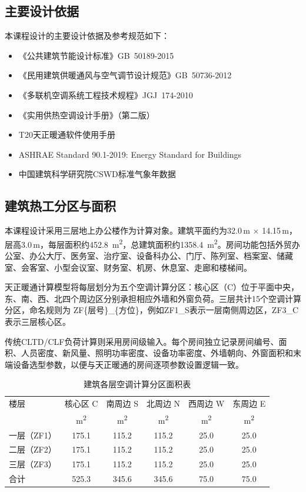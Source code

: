 \subsection{主要设计依据}

本课程设计的主要设计依据及参考规范如下：
\begin{itemize}
    \item \cite{gb50189}《公共建筑节能设计标准》GB~50189-2015
    \item \cite{gb50736}《民用建筑供暖通风与空气调节设计规范》GB~50736-2012
    \item \cite{jgj174}《多联机空调系统工程技术规程》JGJ~174-2010
    \item \cite{luyq2008_hvac_handbook}《实用供热空调设计手册》（第二版）
    \item \cite{tangent_t20_hvac_manual}T20天正暖通软件使用手册
    \item \cite{ashrae9012019}ASHRAE Standard 90.1-2019: Energy Standard for Buildings
    \item \cite{onebuilding}中国建筑科学研究院CSWD标准气象年数据
\end{itemize}


\subsection{建筑热工分区与面积}

本课程设计采用三层地上办公楼作为计算对象。建筑平面约为32.0\,m $\times$ 14.15\,m，层高3.0\,m，每层面积约\SI{452.8}{\meter^2}，总建筑面积约\SI{1358.4}{\meter^2}。房间功能包括外贸办公室、办公大厅、医务室、治疗室、设备科办公、门厅、陈列室、档案室、储藏室、会客室、小型会议室、财务室、机房、休息室、走廊和楼梯间。

天正暖通计算模型将每层划分为五个空调计算分区：核心区（C）位于平面中央，东、南、西、北四个周边区分别承担相应外墙和外窗负荷。三层共计15个空调计算分区，命名规则为 ZF\{层号\}\_\{方位\}，例如ZF1\_S表示一层南侧周边区，ZF3\_C表示三层核心区。

传统CLTD/CLF负荷计算则采用房间级输入。每个房间独立记录房间编号、面积、人员密度、新风量、照明功率密度、设备功率密度、外墙朝向、外窗面积和末端设备选型参数，以便与天正暖通的房间逐项参数设置逻辑一致。

\begin{table}[!htbp]
\centering
\caption{建筑各层空调计算分区面积表}
\label{tab:zone-areas}
\begin{tabular}{@{}lccccc@{}}
\toprule
楼层 & 核心区 C & 南周边 S & 北周边 N & 西周边 W & 东周边 E \\
 & \si{m^2} & \si{m^2} & \si{m^2} & \si{m^2} & \si{m^2} \\
\midrule
一层（ZF1） & 175.1 & 115.2 & 115.2 & 25.0 & 25.0 \\
二层（ZF2） & 175.1 & 115.2 & 115.2 & 25.0 & 25.0 \\
三层（ZF3） & 175.1 & 115.2 & 115.2 & 25.0 & 25.0 \\
\midrule
合计 & 525.3 & 345.6 & 345.6 & 75.0 & 75.0 \\
\bottomrule
\end{tabular}
\end{table}

